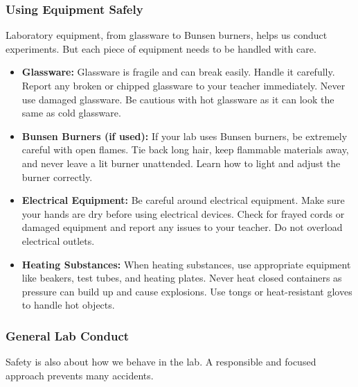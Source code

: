 \subsubsection{Using Equipment Safely}

Laboratory equipment, from glassware to Bunsen burners, helps us conduct experiments. But each piece of equipment needs to be handled with care.

\begin{itemize}
    \item \textbf{Glassware:}  Glassware is fragile and can break easily. Handle it carefully. Report any broken or chipped glassware to your teacher immediately. Never use damaged glassware. Be cautious with hot glassware as it can look the same as cold glassware.
    \item \textbf{Bunsen Burners (if used):}  If your lab uses Bunsen burners, be extremely careful with open flames. Tie back long hair, keep flammable materials away, and never leave a lit burner unattended. Learn how to light and adjust the burner correctly.
    \item \textbf{Electrical Equipment:}  Be careful around electrical equipment. Make sure your hands are dry before using electrical devices. Check for frayed cords or damaged equipment and report any issues to your teacher.  Do not overload electrical outlets.
    \item \textbf{Heating Substances:} When heating substances, use appropriate equipment like beakers, test tubes, and heating plates. Never heat closed containers as pressure can build up and cause explosions. Use tongs or heat-resistant gloves to handle hot objects.
\end{itemize}

\subsubsection{General Lab Conduct}

Safety is also about how we behave in the lab. A responsible and focused approach prevents many accidents.

